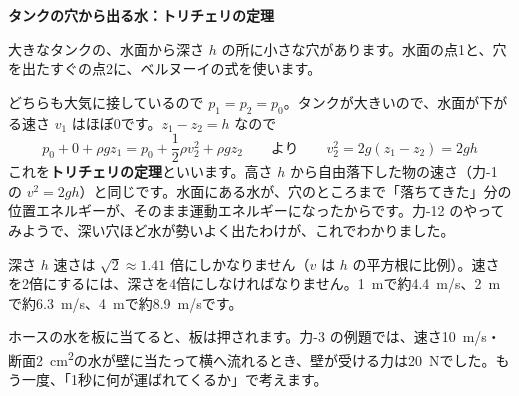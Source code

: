 \noindent\textbf{タンクの穴から出る水：トリチェリの定理}\par\nobreak
\noindent\begin{minipage}[c]{0.36\linewidth}\centering
{}
\end{minipage}\hfill
\begin{minipage}[c]{0.61\linewidth}\raggedright
大きなタンクの、水面から深さ $h$ の所に小さな穴があります。水面の点1と、穴を出たすぐの点2に、ベルヌーイの式を使います。
\end{minipage}
\par\vspace{3pt}
どちらも大気に接しているので $p_1=p_2=p_0$。タンクが大きいので、水面が下がる速さ $v_1$ はほぼ0です。$z_1-z_2=h$ なので
\[ p_0+0+\rho gz_1=p_0+\frac{1}{2}\rho v_2^2+\rho gz_2\qquad\text{より}\qquad v_2^2=2g(z_1-z_2)=2gh \]
\label{ph:力-13:torricelli}これを\textbf{トリチェリの定理}といいます。高さ $h$ から自由落下した物の速さ（力-1 の $v^2=2gh$）と同じです。水面にある水が、穴のところまで「落ちてきた」分の位置エネルギーが、そのまま運動エネルギーになったからです。力-12 のやってみようで、深い穴ほど水が勢いよく出たわけが、これでわかりました。
\begin{phbaisuru}{深さ $h$}
速さは $\sqrt2\approx1.41$ 倍にしかなりません（$v$ は $h$ の平方根に比例）。速さを2倍にするには、深さを4倍にしなければなりません。\qty{1}{m}で約\qty{4.4}{m/s}、\qty{2}{m}で約\qty{6.3}{m/s}、\qty{4}{m}で約\qty{8.9}{m/s}です。
\end{phbaisuru}


\leavevmode\label{ph:力-13:sec3}ホースの水を板に当てると、板は押されます。力-3 の例題では、速さ\qty{10}{m/s}・断面\qty{2}{cm^2}の水が壁に当たって横へ流れるとき、壁が受ける力は\qty{20}{N}でした。もう一度、「1秒に何が運ばれてくるか」で考えます。

